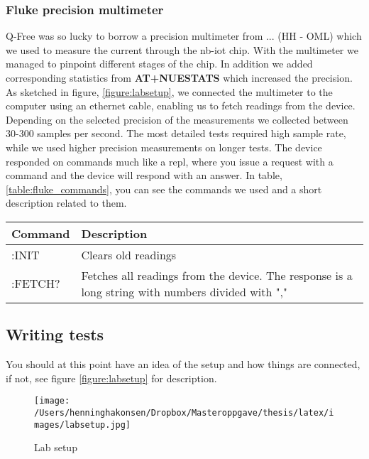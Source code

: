 \documentclass[USenglish]{ifimaster}  %
\begin{document}
\subsubsection{Fluke precision multimeter}
Q-Free was so lucky to borrow a precision multimeter from ... (HH - OML) which we used to measure the current through the \acrshort{nb-iot} chip. With the multimeter we managed to pinpoint different stages of the chip. In addition we added corresponding statistics from \textbf{AT+NUESTATS} which increased the precision. As sketched in figure, \vref{figure:labsetup}, we connected the multimeter to the computer using an ethernet cable, enabling us to fetch readings from the device. Depending on the selected precision of the measurements we collected between 30-300 samples per second. The most detailed tests required high sample rate, while we used higher precision measurements on longer tests. The device responded on commands much like a \acrfull{repl}, where you issue a request with a command and the device will respond with an answer. In table, \vref{table:fluke_commands}, you can see the commands we used and a short description related to them.

\begin{center} \label{table:fluke_commands}
  \begin{tabular}{ | l | m{10cm} | }
    \hline
    Command & Description \\
    \hline
    :INIT & Clears old readings \\
    \hline
    :FETCH? & Fetches all readings from the device. The response is a long string with numbers divided with "," \\
    \hline
  \end{tabular}
\end{center}

\subsection{Writing tests}
You should at this point have an idea of the setup and how things are connected, if not, see figure \vref{figure:labsetup} for description.

\begin{figure}[ht]
  \centering\texttt{[image: /Users/henninghakonsen/Dropbox/Masteroppgave/thesis/latex/images/labsetup.jpg]}
  \caption{Lab setup \cite{pcpng35052:online} \cite{fluke88435:online} \cite{ingagrue31:online}}
  \label{figure:labsetup}
\end{figure}
\end{document}
